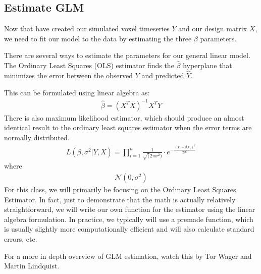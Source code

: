 \documentclass[letterpaper,10pt,english]{sphinxmanual}
\begin{document}
\noindent{}


\subsection{Estimate GLM}
\label{\detokenize{content/GLM:estimate-glm}}
Now that have created our simulated voxel timeseries \(Y\) and our design matrix \(X\), we need to fit our model to the data by estimating the three \(\beta\) parameters.

There are several ways to estimate the parameters for our general linear model. The Ordinary Least Squares (OLS) estimator finds the \(\hat\beta\) hyperplane that minimizes the error between the observed \(Y\) and predicted \(\hat Y\).

This can be formulated using linear algebra as:
\begin{equation*}
\begin{split}\hat{\beta} = (X^T X)^{-1}X^TY\end{split}
\end{equation*}
There is also maximum likelihood estimator, which should produce an almost identical result to the ordinary least squares estimator when the error terms are normally distributed.
\begin{equation*}
\begin{split}L(\beta, \sigma^2 | Y, X) = \displaystyle \prod_{i=1}^{n}\frac{1}{\sqrt(2\pi\sigma^2)} \cdot e^{-\frac{(Y_i - \beta X_i)^2}{2\sigma^2}}\end{split}
\end{equation*}
where
\begin{equation*}
\begin{split}\mathcal{N}(0,\sigma^{2})\end{split}
\end{equation*}
For this class, we will primarily be focusing on the Ordinary Least Squares Estimator. In fact, just to demonstrate that the math is actually relatively straightforward, we will write our own function for the estimator using the linear algebra formulation. In practice, we typically will use a premade function, which is usually slightly more computationally efficient and will also calculate standard errors, etc.

For a more in depth overview of GLM estimation, watch this  by Tor Wager and Martin Lindquist.
\end{document}
